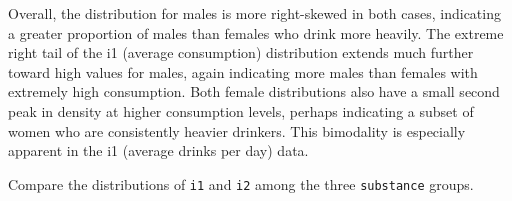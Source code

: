 \documentclass[twoside]{book}\usepackage[]{graphicx}\usepackage[]{xcolor}
\newenvironment{knitrout}{}{} %
\newcommand{\variable}[1]{{\color{green!50!black}\texttt{#1}}}
\begin{document}
\begin{solution}
\begin{knitrout}
{}



\end{knitrout}
Overall, the distribution for males is more right-skewed in both cases, indicating a greater proportion of males than females who drink more heavily.  The extreme right tail of the i1 (average consumption) distribution extends much further toward high values for males, again indicating more males than females with extremely high consumption.  Both female distributions also have a small second peak in density at higher consumption levels, perhaps indicating a subset of women who are consistently heavier drinkers. This bimodality is especially apparent in the i1 (average drinks per day) data.  
\end{solution}

\begin{problem}
	Compare the distributions of \variable{i1} and \variable{i2} among 
	the three \variable{substance} groups.
\end{problem}
\end{document}

